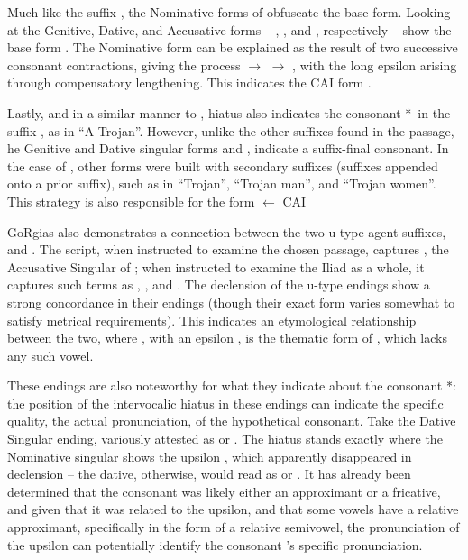 Much like the suffix , the Nominative forms of 
obfuscate the base form. Looking at the Genitive, Dative, and Accusative
forms -- , , and , respectively --
show the base form . The Nominative form can be explained
as the result of two successive consonant contractions, giving the
process  $\to$  $\to$ , with
the long epsilon 
arising through compensatory
lengthening. This indicates the CAI form .

Lastly, and in a similar manner to , hiatus also indicates the consonant *\w\ in the suffix , as in  ``A Trojan''. However, unlike the other suffixes found in the passage, he Genitive and Dative singular forms  and , indicate a suffix-final consonant. In the case of , other forms were built with secondary suffixes (suffixes appended onto a prior suffix), such as in  ``Trojan'',  ``Trojan man'', and  ``Trojan women''. This strategy is also responsible for the form  $\gets$ CAI 



GoRgias also demonstrates a connection between the two
u-type agent suffixes,  and . The script, when
instructed to examine the chosen passage, captures , the
Accusative Singular of ; when instructed to examine the
Iliad as a whole, it captures such terms as ,
, and . The declension of the u-type
endings show a strong concordance in their endings (though
their exact form varies somewhat to satisfy metrical requirements).
This indicates an etymological relationship between the two, where
, with an epsilon , is the
thematic form of , which lacks any such vowel. 



These endings are also noteworthy for what they indicate about the
consonant *\w: the position of the intervocalic hiatus in these
endings can indicate the specific quality, the actual pronunciation,
of the hypothetical consonant.
Take the Dative Singular ending, variously attested as 
or . The hiatus stands exactly where the Nominative
singular shows the upsilon , which apparently
disappeared in declension -- the dative, otherwise, would read as
 or . It has already been determined
that the consonant was likely either an approximant or a fricative,
and given that it was related to the upsilon, and that some vowels
have a relative approximant, specifically in the form of a relative
semivowel, the pronunciation of the upsilon
can potentially identify the consonant \w's specific pronunciation.

